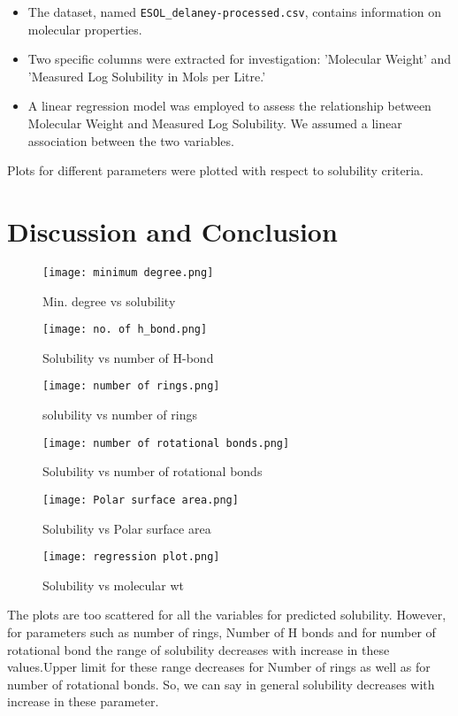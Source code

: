 \documentclass[20pt]{article}
\begin{document}
\begin{itemize}
    \item The dataset, named \texttt{ESOL\_delaney-processed.csv}, contains information on molecular properties.
    \item Two specific columns were extracted for investigation: 'Molecular Weight' and 'Measured Log Solubility in Mols per Litre.'
    \item A linear regression model was employed to assess the relationship between Molecular Weight and Measured Log Solubility. We assumed a linear association between the two variables.
\end{itemize}
Plots for different parameters were plotted with respect to solubility criteria.\\

\section{Discussion and Conclusion}
\begin{figure}
    \centering
    \texttt{[image: minimum degree.png]}
    \caption{Min. degree vs solubility}
    \label{fig:enter-label}
\end{figure}
\begin{figure}
    \centering
    \texttt{[image: no. of h\_bond.png]}
    \caption{Solubility vs number of H-bond}
    \label{fig:enter-label}
\end{figure}
\begin{figure}
    \centering
    \texttt{[image: number of rings.png]}
    \caption{solubility vs number of rings}
    \label{fig:enter-label}
\end{figure}
\begin{figure}
    \centering
    \texttt{[image: number of rotational bonds.png]}
    \caption{Solubility vs number of rotational bonds}
    \label{fig:enter-label}
\end{figure}
\begin{figure}
    \centering
    \texttt{[image: Polar surface area.png]}
    \caption{Solubility vs Polar surface area}
    \label{fig:enter-label}
\end{figure}
\begin{figure}
    \centering
    \texttt{[image: regression plot.png]}
    \caption{Solubility vs molecular wt}
    \label{fig:enter-label}
\end{figure}
The plots are too scattered for all the variables for predicted solubility. However, for parameters such as number of rings, Number of H bonds and for number of rotational bond the range of solubility decreases with increase in these values.Upper limit for these range decreases for Number of rings as well as for number of rotational bonds. So, we can say in general solubility decreases with increase in these parameter.
\end{document}
